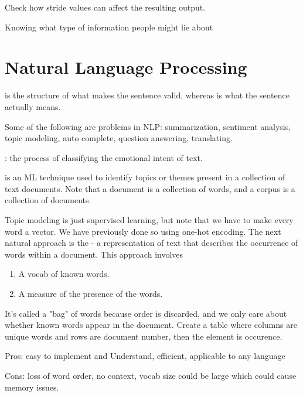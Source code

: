 \documentclass[12pt]{scrartcl}
\begin{document}
Check how stride values can affect the resulting output.

Knowing what type of information people might lie about

\section{Natural Language Processing}

\begin{definition}
   is the structure of what makes the sentence valid, whereas 
   is what the sentence actually means.
\end{definition}

\begin{note}
  Some of the following are problems in NLP: summarization, sentiment analysis, topic modeling, 
  auto complete, question answering, translating.
\end{note}

\begin{definition}
  : the process of classifying the emotional intent of text.
\end{definition}

\begin{definition}
   is an ML technique used to identify topics or themes present in a collection 
  of text documents. Note that a document is a collection of words, and a corpus is a collection of documents.
\end{definition}

\begin{definition}
  Topic modeling is just supervised learning, but note that we have to make every word a vector. We have previously done 
  so using one-hot encoding. The next natural approach is the  - a representation 
  of text that describes the occurrence of words within a document. This approach involves 
  \begin{enumerate}
    \item A vocab of known words.
    \item A measure of the presence of the words.
  \end{enumerate}
  It's called a "bag" of words because order is discarded, and we only care 
  about whether known words appear in the document. Create a table where columns are unique words 
  and rows are document number, then the element is occurence.

  Pros: easy to implement and Understand, efficient, applicable to any language

  Cons: loss of word order, no context, vocab size could be large which could cause memory issues.
\end{definition}
\end{document}
